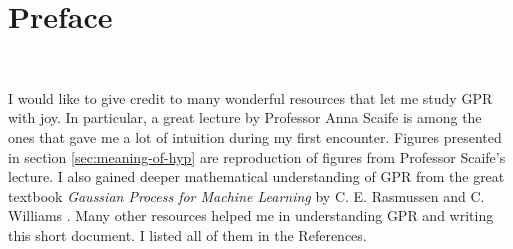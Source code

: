 \documentclass[10pt,twocolumn]{article}
\begin{document}


\vspace{10mm}

\setlength{\parindent}{0cm}

\fontsize{14}{10}\selectfont {Kamila Zdybał}

\vspace{2mm}

\fontsize{8}{10}

\fontsize{8}{10}

\section*{Preface}

\,\,

I would like to give credit to many wonderful resources that let me study GPR with joy. In particular, a great lecture by Professor Anna Scaife \cite{Scaife} is among the ones that gave me a lot of intuition during my first encounter. Figures presented in section \ref{sec:meaning-of-hyp} are reproduction of figures from Professor Scaife's lecture. I also gained deeper mathematical understanding of GPR from the great textbook \textit{Gaussian Process for Machine Learning} by C. E. Rasmussen and C. Williams \cite{Rasmussen}. Many other resources helped me in understanding GPR and writing this short document. I listed all of them in the References.
\end{document}
